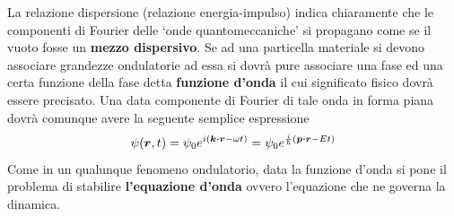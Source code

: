 La relazione dispersione (relazione energia-impulso) indica chiaramente
che le componenti di Fourier delle `onde quantomeccaniche' si propagano
come se il vuoto fosse un \textbf{mezzo dispersivo}.
Se ad una particella materiale si devono associare grandezze ondulatorie
ad essa si dovrà pure associare una fase ed una certa funzione della
fase detta \textbf{funzione d'onda} il cui significato fisico dovrà
essere precisato.
Una data componente di Fourier di tale onda in forma
piana dovrà comunque avere la seguente semplice espressione
\begin{equation}
	\psi(\bm{r},t) = \psi_0 e^{i(\bm{k \cdot r}-\omega t)} = \psi_{0} e^{\frac{i}{\hp}(\bm{p \cdot r}-E t)}
	\label{eq:wave-function-expr}
\end{equation}
Come in un qualunque fenomeno ondulatorio, data la
funzione d'onda si pone il problema di stabilire \textbf{l'equazione
d'onda} ovvero l'equazione che ne governa la dinamica.


